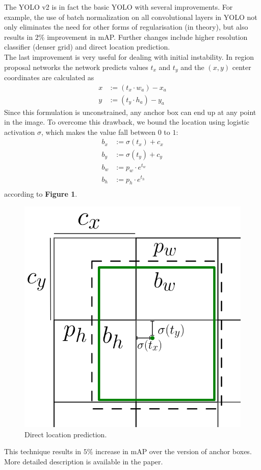\documentclass{article}
\begin{document}
The YOLO v2 is in fact the basic YOLO with several improvements. For example, the use of batch normalization on all convolutional layers in YOLO not only eliminates the need for other forms of regularisation (in theory), but also results in $2\%$ improvement in mAP. Further changes include higher resolution classifier (denser grid) and direct location prediction. \\
The last improvement is very useful for dealing with initial instability. In region proposal networks the network predicts values $t_x$ and $t_y$ and the $(x,y)$ center coordinates are calculated as
\begin{equation}
\begin{aligned}
x &:= (t_x \cdot w_a)-x_a \\
y &:= (t_y \cdot h_a)-y_a
\end{aligned}
\end{equation}
Since this formulation is unconstrained, any anchor box can end up at any point in the image. To overcome this drawback, we bound the location using logistic activation $\sigma$, which makes the value fall between $0$ to $1$:
\begin{equation}
\begin{aligned}
b_x &:= \sigma(t_x) + c_x \\
b_y &:= \sigma(t_y) + c_y \\
b_w &:= p_w \cdot e^{t_w} \\
b_h &:= p_h \cdot e^{t_h} \\
\end{aligned}
\end{equation}
according to \textbf{Figure 1}.\\
\begin{figure}
\centering
\includegraphics[scale=0.25]{scheme.png}
\caption{Direct location prediction.}
\end{figure}
This technique results in $5\%$ increase in mAP over the version of anchor boxes.
\\ More detailed description is available in the paper.
\end{document}
